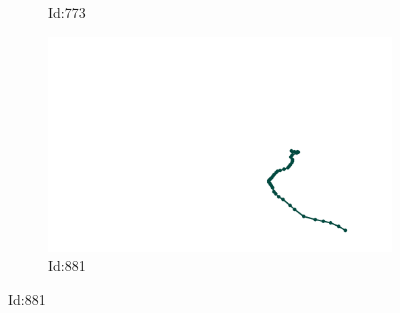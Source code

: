 \documentclass[12pt,twoside]{report}
\begin{document}
\begin{figure}
\begin{subfigure}[b]{0.20\textwidth}
\caption{Id:773}
\end{subfigure}
\begin{subfigure}[b]{0.20\textwidth}
\centering
\includegraphics[width=\textwidth]{../../trajectories/881.png}
\caption{Id:881}
\end{subfigure}
\end{figure}
\end{document}
